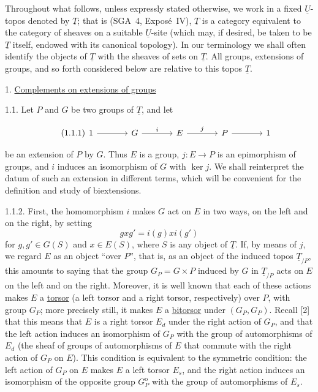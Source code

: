 Throughout what follows, unless expressly stated otherwise, we work in a
fixed $\underline U$-topos denoted by $\underline T$; that is (SGA~4,
Expos\'e~IV), $\underline T$ is a category equivalent to the category of
sheaves on a suitable $\underline U$-site (which may, if desired, be taken
to be $\underline T$ itself, endowed with its canonical topology). In our
terminology we shall often identify the objects of $\underline T$ with
the sheaves of sets on $\underline T$. All groups, extensions of groups,
and so forth considered below are relative to this topos $\underline T$.

1. \underline{Complements on extensions of groups}

1.1. Let $P$ and $G$ be two groups of $\underline T$, and let

\begin{equation}\tag{1.1.1}
\begin{tikzcd}[column sep=large]
1 \arrow[r] & G \arrow[r, "i"] & E \arrow[r, "j"] & P \arrow[r] & 1
\end{tikzcd}
\end{equation}

be an extension of $P$ by $G$. Thus $E$ is a group,
$j:E\longrightarrow P$ is an epimorphism of groups, and $i$ induces an
isomorphism of $G$ with $\ker j$. We shall reinterpret the datum of such
an extension in different terms, which will be convenient for the
definition and study of biextensions.


1.1.2. First, the homomorphism $i$ makes $G$ act on $E$ in two ways, on
the left and on the right, by setting
\[
 gxg'=i(g)xi(g')
\]
for $g,g'\in G(S)$ and $x\in E(S)$, where $S$ is any object of
$\underline T$. If, by means of $j$, we regard $E$ as an object ``over
$P$'', that is, as an object of the induced topos $\underline T_{/P}$,
this amounts to saying that the group $G_P=G\times P$ induced by $G$ in
$\underline T_{/P}$ acts on $E$ on the left and on the right. Moreover,
it is well known that each of these actions makes $E$ a
\underline{torsor} (a left torsor and a right torsor, respectively) over
$P$, with group $G_P$; more precisely still, it makes $E$ a
\underline{bitorsor} under $(G_P,G_P)$. Recall [2] that this means that
$E$ is a right torsor $E_d$ under the right action of $G_P$, and that the
left action induces an isomorphism of $G_P$ with the group of
automorphisms of $E_d$ (the sheaf of groups of automorphisms of $E$ that
commute with the right action of $G_P$ on $E$). This condition is
equivalent to the symmetric condition: the left action of $G_P$ on $E$
makes $E$ a left torsor $E_s$, and the right action induces an
isomorphism of the opposite group $G_P^{\mathrm o}$ with the group of
automorphisms of $E_s$.

